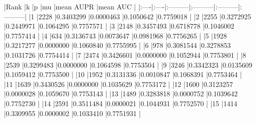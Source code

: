 \documentclass{article}
\begin{document}
\begin{Schunk}
\begin{Soutput}
|Rank |k    |p         |mu        |mean AUPR |mean AUC  |
|:----|:----|:---------|:---------|:---------|:---------|
|1    |2228 |0.3403299 |0.0000463 |0.1050642 |0.7759018 |
|2    |2255 |0.3272925 |0.2449971 |0.1064295 |0.7757571 |
|3    |2148 |0.3457493 |0.6718778 |0.1046002 |0.7757414 |
|4    |634  |0.3136743 |0.0073647 |0.0981968 |0.7756265 |
|5    |1928 |0.3217277 |0.0000000 |0.1060840 |0.7755995 |
|6    |978  |0.3081544 |0.3278853 |0.1031726 |0.7754414 |
|7    |2474 |0.3426601 |0.0000000 |0.1052944 |0.7753801 |
|8    |2539 |0.3299483 |0.0000000 |0.1064598 |0.7753504 |
|9    |3246 |0.3342323 |0.0135609 |0.1059412 |0.7753500 |
|10   |1952 |0.3131336 |0.0010847 |0.1068391 |0.7753464 |
|11   |1639 |0.3430526 |0.0000000 |0.1035629 |0.7753172 |
|12   |1600 |0.3123257 |0.0000028 |0.1059670 |0.7753143 |
|13   |1489 |0.3283818 |0.0000752 |0.1039642 |0.7752730 |
|14   |2591 |0.3511484 |0.0000021 |0.1044931 |0.7752570 |
|15   |1414 |0.3309955 |0.0000002 |0.1033410 |0.7751931 |
\end{Soutput}
\end{Schunk}
\end{document}

